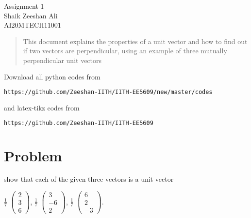 \documentclass[journal,12pt,twocolumn]{IEEEtran}
\begin{document}
\begin{center}
\huge Assignment 1\\

\large Shaik Zeeshan Ali\\
\large AI20MTECH11001\\
\end{center}
\vspace{0.5cm}
\begin{abstract}
This document explains the properties of a unit vector and how to find out if two vectors are perpendicular, using an example of three mutually perpendicular unit vectors
\end{abstract}
\vspace{0.5cm}
Download all python codes from 
\begin{lstlisting}
https://github.com/Zeeshan-IITH/IITH-EE5609/new/master/codes
\end{lstlisting}
%
and latex-tikz codes from 
\begin{lstlisting}
https://github.com/Zeeshan-IITH/IITH-EE5609
\end{lstlisting}
%
\vspace{0.5cm}
\section{Problem}
show that each of the given three vectors is a unit vector

\(\frac{1}{7}\) $\begin{pmatrix}2 \\3 \\6\end{pmatrix}$,
\(\frac{1}{7}\) $\begin{pmatrix}3 \\-6 \\2\end{pmatrix}$,
\(\frac{1}{7}\) $\begin{pmatrix}6 \\2 \\-3\end{pmatrix}$.
\end{document}
